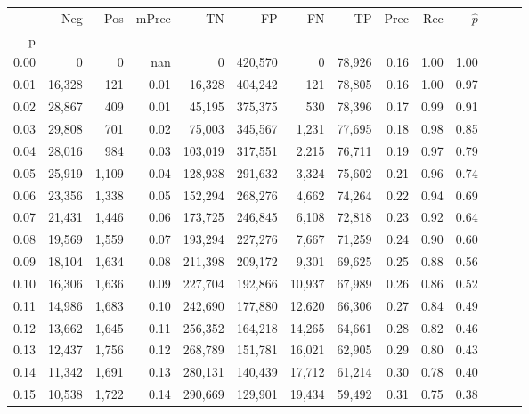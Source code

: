 \begin{tabular}{rrrrrrrrrrrrrr}
\toprule
{} &     Neg &    Pos & mPrec &       TN &       FP &      FN &      TP &  Prec &   Rec & $\hat{p}$ \\
p    &         &        &       &          &          &         &         &       &       &           \\
\midrule
0.00 &       0 &      0 &   nan &        0 &  420,570 &       0 &  78,926 &  0.16 &  1.00 &      1.00 \\
0.01 &  16,328 &    121 &  0.01 &   16,328 &  404,242 &     121 &  78,805 &  0.16 &  1.00 &      0.97 \\
0.02 &  28,867 &    409 &  0.01 &   45,195 &  375,375 &     530 &  78,396 &  0.17 &  0.99 &      0.91 \\
0.03 &  29,808 &    701 &  0.02 &   75,003 &  345,567 &   1,231 &  77,695 &  0.18 &  0.98 &      0.85 \\
0.04 &  28,016 &    984 &  0.03 &  103,019 &  317,551 &   2,215 &  76,711 &  0.19 &  0.97 &      0.79 \\
0.05 &  25,919 &  1,109 &  0.04 &  128,938 &  291,632 &   3,324 &  75,602 &  0.21 &  0.96 &      0.74 \\
0.06 &  23,356 &  1,338 &  0.05 &  152,294 &  268,276 &   4,662 &  74,264 &  0.22 &  0.94 &      0.69 \\
0.07 &  21,431 &  1,446 &  0.06 &  173,725 &  246,845 &   6,108 &  72,818 &  0.23 &  0.92 &      0.64 \\
0.08 &  19,569 &  1,559 &  0.07 &  193,294 &  227,276 &   7,667 &  71,259 &  0.24 &  0.90 &      0.60 \\
0.09 &  18,104 &  1,634 &  0.08 &  211,398 &  209,172 &   9,301 &  69,625 &  0.25 &  0.88 &      0.56 \\
0.10 &  16,306 &  1,636 &  0.09 &  227,704 &  192,866 &  10,937 &  67,989 &  0.26 &  0.86 &      0.52 \\
0.11 &  14,986 &  1,683 &  0.10 &  242,690 &  177,880 &  12,620 &  66,306 &  0.27 &  0.84 &      0.49 \\
0.12 &  13,662 &  1,645 &  0.11 &  256,352 &  164,218 &  14,265 &  64,661 &  0.28 &  0.82 &      0.46 \\
0.13 &  12,437 &  1,756 &  0.12 &  268,789 &  151,781 &  16,021 &  62,905 &  0.29 &  0.80 &      0.43 \\
0.14 &  11,342 &  1,691 &  0.13 &  280,131 &  140,439 &  17,712 &  61,214 &  0.30 &  0.78 &      0.40 \\
0.15 &  10,538 &  1,722 &  0.14 &  290,669 &  129,901 &  19,434 &  59,492 &  0.31 &  0.75 &      0.38 \\

\end{tabular}
